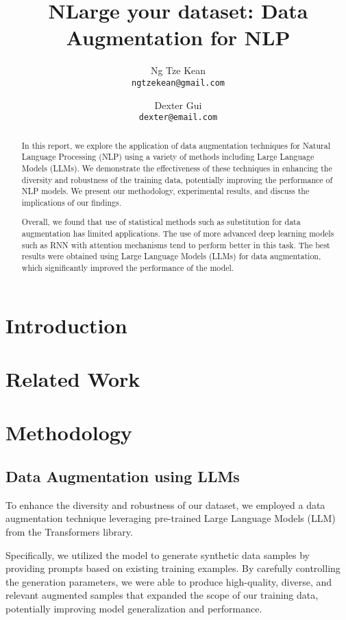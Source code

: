 \documentclass{article}
\title{NLarge your dataset: Data Augmentation for NLP}
\author{
  Ng Tze Kean \\
  \texttt{ngtzekean@gmail.com}
  \and
  Dexter Gui \\
  \texttt{dexter@email.com}
}
\begin{document}
\maketitle

\begin{abstract}

  In this report, we explore the application of data augmentation techniques for
  Natural Language Processing (NLP) using a variety of methods including
  Large Language Models (LLMs). We demonstrate the effectiveness of these
  techniques in enhancing the diversity and robustness of the training data,
  potentially improving the performance of NLP models. We present our
  methodology, experimental results, and discuss the implications of our
  findings.

  Overall, we found that use of statistical methods such as substitution for 
  data augmentation has limited applications. The use of more advanced deep
  learning models such as RNN with attention mechanisms tend to perform better
  in this task. The best results were obtained using Large Language Models
  (LLMs) for data augmentation, which significantly improved the performance of
  the model.

\end{abstract}

\section{Introduction}

\section{Related Work}

\section{Methodology}

\subsection{Data Augmentation using LLMs}

To enhance the diversity and robustness of our dataset, we employed a data
augmentation technique leveraging pre-trained Large Language Models (LLM) from
the Transformers library.

Specifically, we utilized the model to generate synthetic data samples by
providing prompts based on existing training examples. By carefully controlling
the generation parameters, we were able to produce high-quality, diverse, and
relevant augmented samples that expanded the scope of our training data,
potentially improving model generalization and performance.
\end{document}
